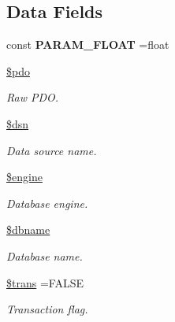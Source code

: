\subsection*{Data Fields}
\begin{DoxyCompactItemize}
\item 
\hypertarget{class_d_b_1_1_s_q_l_ae82417822cd5c7de57aa5816da1b922c}{}\label{class_d_b_1_1_s_q_l_ae82417822cd5c7de57aa5816da1b922c} 
const {\bfseries P\+A\+R\+A\+M\+\_\+\+F\+L\+O\+AT} =\textquotesingle{}float\textquotesingle{}
\item 
\hypertarget{class_d_b_1_1_s_q_l_a5766efd703cef0e00bfc06b3f3acbe0e}{}\label{class_d_b_1_1_s_q_l_a5766efd703cef0e00bfc06b3f3acbe0e} 
\hyperlink{class_d_b_1_1_s_q_l_a5766efd703cef0e00bfc06b3f3acbe0e}{\$pdo}
\begin{DoxyCompactList}\small\item\em Raw P\+DO. \end{DoxyCompactList}\item 
\hypertarget{class_d_b_1_1_s_q_l_a6441cca8c9fa11e16d2017e8cb733c10}{}\label{class_d_b_1_1_s_q_l_a6441cca8c9fa11e16d2017e8cb733c10} 
\hyperlink{class_d_b_1_1_s_q_l_a6441cca8c9fa11e16d2017e8cb733c10}{\$dsn}
\begin{DoxyCompactList}\small\item\em Data source name. \end{DoxyCompactList}\item 
\hypertarget{class_d_b_1_1_s_q_l_a8a3b012ad4844366d9207d8f0e174a00}{}\label{class_d_b_1_1_s_q_l_a8a3b012ad4844366d9207d8f0e174a00} 
\hyperlink{class_d_b_1_1_s_q_l_a8a3b012ad4844366d9207d8f0e174a00}{\$engine}
\begin{DoxyCompactList}\small\item\em Database engine. \end{DoxyCompactList}\item 
\hypertarget{class_d_b_1_1_s_q_l_ac5111a571fffa2499732833bb7f0d8c1}{}\label{class_d_b_1_1_s_q_l_ac5111a571fffa2499732833bb7f0d8c1} 
\hyperlink{class_d_b_1_1_s_q_l_ac5111a571fffa2499732833bb7f0d8c1}{\$dbname}
\begin{DoxyCompactList}\small\item\em Database name. \end{DoxyCompactList}\item 
\hypertarget{class_d_b_1_1_s_q_l_ac75852aae94b46848119a6d7c922cf2e}{}\label{class_d_b_1_1_s_q_l_ac75852aae94b46848119a6d7c922cf2e} 
\hyperlink{class_d_b_1_1_s_q_l_ac75852aae94b46848119a6d7c922cf2e}{\$trans} =F\+A\+L\+SE
\begin{DoxyCompactList}\small\item\em Transaction flag. \end{DoxyCompactList}\item 

\end{DoxyCompactItemize}
